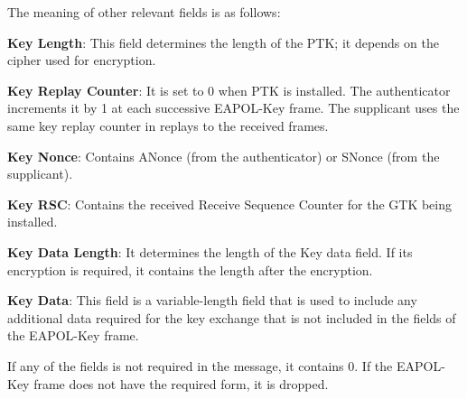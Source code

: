 The meaning of other relevant fields is as follows: 
\begin{description}
\item \textbf{Key Length}: This field determines the length of the PTK; it depends on the cipher used for encryption.
\item \textbf{Key Replay Counter}: It is set to 0 when PTK is installed. The authenticator increments it by 1 at each successive EAPOL-Key frame. The supplicant uses the same key replay counter in replays to the received frames.
\item \textbf{Key Nonce}: Contains ANonce (from the authenticator) or SNonce (from the supplicant).
\item \textbf{Key RSC}: Contains the received Receive Sequence Counter for the GTK being installed. 
\item \textbf{Key Data Length}: It determines the length of the Key data field. If its encryption is required, it contains the length after the encryption.
\item \textbf{Key Data}: This field is a variable-length field that is used to include any additional data required for the key exchange that is not included in the fields of the EAPOL-Key frame.
\end{description}

If any of the fields is not required in the message, it contains 0. If the EAPOL-Key frame does not have the required form, it is dropped.

